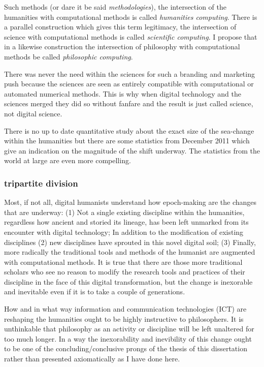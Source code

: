 \documentclass[dah,phd,a4paper]{xe_uccthesis}
\begin{document}
Such methods (or dare it be said \emph{methodologies}), the intersection of the humanities with computational methods is called \emph{humanities computing}. There is a parallel construction which gives this term legitimacy, the intersection of science with computational methods is called \emph{scientific computing}. I propose that in a likewise construction the intersection of philosophy with computational methods be called \emph{philosophic computing}.

There was never the need within the sciences for such a branding and marketing push because the sciences are seen as entirely compatible with computational or automated numerical methods. This is why when digital technology and the sciences merged they did so without fanfare and the result is just called science, not digital science. 

There is no up to date quantitative study about the exact size of the sea-change within the humanities but there are some statistics from December 2011\cite{terras_infographic_2011} which give an indication on the magnitude of the shift underway. The statistics from the world at large are even more compelling\citep{hilbert_worlds_2011}.

\subsubsection{tripartite division}

Most, if not all, digital humanists understand how epoch-making are the changes that are underway: (1) Not a single existing discipline within the humanities, regardless how ancient and storied its lineage, has been left unmarked from its encounter with digital technology; In addition to the modification of existing disciplines (2) new disciplines have sprouted in this novel digital soil; (3) Finally, more radically the traditional tools and methods of the humanist are augmented with computational methods. It is true that there are those more traditional scholars who see no reason to modify the research tools and practices of their discipline in the face of this digital transformation, but the change is inexorable and inevitable even if it is to take a couple of generations.

How and in what way information and communication technologies (ICT) are reshaping the humanities ought to be highly instructive to philosophers. It is unthinkable that philosophy as an activity or discipline will be left unaltered for too much longer. In a way the inexorability and inevibility of this change ought to be one of the concluding/conclusive prongs of the thesis of this dissertation rather than presented axiomatically as I have done here.
\end{document}
